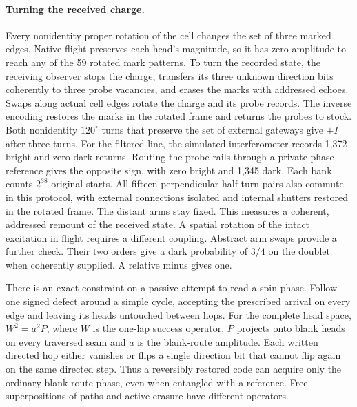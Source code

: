 \paragraph{Turning the received charge.}
Every nonidentity proper rotation of the cell changes the set of three
marked edges. Native flight preserves each head's
magnitude, so it has zero amplitude to reach any of the 59 rotated mark
patterns. To turn the recorded state, the receiving observer stops the charge,
transfers its three unknown direction bits coherently to three probe
vacancies, and erases the marks with addressed echoes. Swaps along actual
cell edges rotate the charge and its probe records. The inverse encoding
restores the marks in the rotated frame and returns the probes to stock.
Both nonidentity $120^\circ$ turns that preserve the set of external gateways
give $+I$ after three turns. For the filtered line, the simulated
interferometer records 1,372 bright and zero dark returns. Routing the probe rails through a private phase reference gives the
opposite sign, with zero bright and 1,345 dark.
Each bank counts $2^{38}$ original starts. All fifteen perpendicular
half-turn pairs also commute in this protocol, with external connections
isolated and internal shutters restored in the rotated frame. The distant
arms stay fixed. This measures a coherent, addressed remount of the received
state. A spatial rotation of the intact excitation in flight requires a
different coupling. Abstract arm swaps provide a further check. Their two
orders give a dark probability of $3/4$ on the doublet when coherently
supplied. A relative minus gives one.

There is an exact constraint on a passive attempt to read a spin phase.
Follow one signed defect around a simple cycle, accepting the prescribed
arrival on every edge and leaving its heads untouched between hops. For
the complete head space, $W^2=a^2P$, where $W$ is the one-lap success
operator, $P$ projects onto blank heads on every traversed seam and $a$
is the blank-route amplitude. Each written directed hop either vanishes
or flips a single direction bit that cannot flip again on the same directed
step. Thus a reversibly restored code can acquire only the ordinary
blank-route phase, even when entangled with a reference. Free superpositions
of paths and active erasure have different operators.

